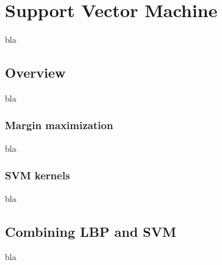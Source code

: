 \chapter{Support Vector Machine}
\label{chap:svm}

\noindent bla
\newline

\section{Overview}

\noindent bla
\newline

\subsection{Margin maximization}

\vspace{\baselineskip}
\noindent bla
\newline

\subsection{SVM kernels}

\vspace{\baselineskip}
\noindent bla
\newline

\section{Combining LBP and SVM}

\noindent bla
\newline
